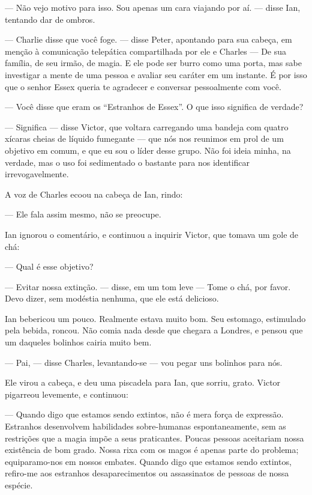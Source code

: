 --- Não vejo motivo para isso. Sou apenas um cara viajando por aí. --- disse
Ian, tentando dar de ombros.

--- Charlie disse que você foge. --- disse Peter, apontando para sua cabeça, em
menção à comunicação telepática compartilhada por ele e Charles --- De sua
família, de seu irmão, de magia. E ele pode ser burro como uma porta, mas sabe
investigar a mente de uma pessoa e avaliar seu caráter em um instante. É por
isso que o senhor Essex queria te agradecer e conversar pessoalmente com você.

--- Você disse que eram os “Estranhos de Essex”. O que isso significa de
verdade?

--- Significa --- disse Victor, que voltara carregando uma bandeja com quatro
xícaras cheias de líquido fumegante --- que nós nos reunimos em prol de um
objetivo em comum, e que eu sou o líder desse grupo. Não foi ideia minha, na
verdade, mas o uso foi sedimentado o bastante para nos identificar
irrevogavelmente.

A voz de Charles ecoou na cabeça de Ian, rindo:

--- Ele fala assim mesmo, não se preocupe.

Ian ignorou o comentário, e continuou a inquirir Victor, que tomava um gole de
chá:

--- Qual é esse objetivo?

--- Evitar nossa extinção. --- disse, em um tom leve --- Tome o chá, por favor.
Devo dizer, sem modéstia nenhuma, que ele está delicioso.

Ian bebericou um pouco. Realmente estava muito bom. Seu estomago, estimulado
pela bebida, roncou. Não comia nada desde que chegara a Londres, e pensou que
um daqueles bolinhos cairia muito bem.

--- Pai, --- disse Charles, levantando-se --- vou pegar uns bolinhos para nós.

Ele virou a cabeça, e deu uma piscadela para Ian, que sorriu, grato. Victor
pigarreou levemente, e continuou:

--- Quando digo que estamos sendo extintos, não é mera força de expressão.
Estranhos desenvolvem habilidades sobre-humanas espontaneamente, sem as
restrições que a magia impõe a seus praticantes. Poucas pessoas aceitariam
nossa existência de bom grado. Nossa rixa com os magos é apenas parte do
problema; equiparamo-nos em nossos embates. Quando digo que estamos sendo
extintos, refiro-me aos estranhos desaparecimentos ou assassinatos de pessoas
de nossa espécie.

